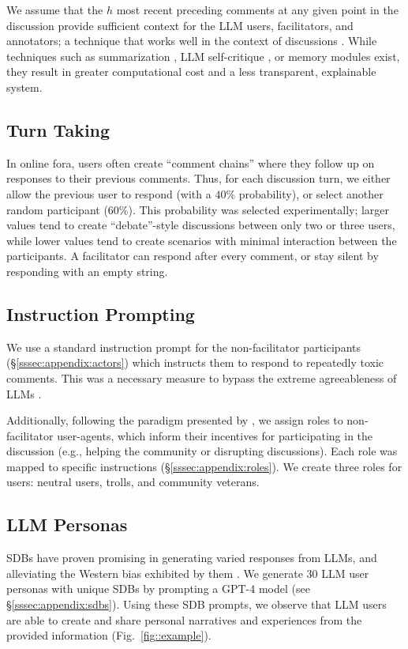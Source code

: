 We assume that the $h$ most recent preceding comments at any given point in the discussion provide sufficient context for the \ac{LLM} users, facilitators, and annotators; a technique that works well in the context of discussions \cite{pavlopoulos_2020_toxicity}. While techniques such as summarization \cite{balog_2024}, \ac{LLM} self-critique \cite{yu_2024_fincon}, or memory modules \cite{Vezhnevets2023GenerativeAM} exist, they result in greater computational cost and a less transparent, explainable system.


\subsection{Turn Taking}
\label{ssec:methodology:turn}

In online fora, users often create ``comment chains'' where they follow up on responses to their previous comments. Thus, for each discussion turn, we either allow the previous user to respond (with a $40\%$ probability), or select another random participant ($60\%$). This probability was selected experimentally; larger values tend to create ``debate''-style discussions between only two or three users, while lower values tend to create scenarios with minimal interaction between the participants. A facilitator can respond after every comment, or stay silent by responding with an empty string.


\subsection{Instruction Prompting}
\label{ssec:methodology:prompts-instructions}

We use a standard instruction prompt for the non-facilitator participants (\S\ref{sssec:appendix:actors}) which instructs them to respond to repeatedly toxic comments. This was a necessary measure to bypass the extreme agreeableness of \acp{LLM}  \cite{park2023game}.

Additionally, following the paradigm presented by \citet{abdelnabi_negotiations}, we assign roles to non-facilitator user-agents, which inform their incentives for participating in the discussion (e.g., helping the community or disrupting discussions). Each role was mapped to specific instructions (\S\ref{sssec:appendix:roles}). We create three roles for users: neutral users, trolls, and community veterans.    


\subsection{LLM Personas}    
\label{ssec:methodology:prompts-sdb}                

\acfp{SDB} have proven promising in generating varied responses from \acp{LLM}, and alleviating the Western bias exhibited by them \cite{burton2024large}. We generate 30 \ac{LLM} user personas with unique \acp{SDB} by prompting a GPT-4 model \cite{openai2024gpt4technicalreport} (see \S\ref{sssec:appendix:sdbs}). Using these \ac{SDB} prompts, we observe that \ac{LLM} users are able to create and share personal narratives and experiences from the provided information (Fig.~\ref{fig::example}). 
